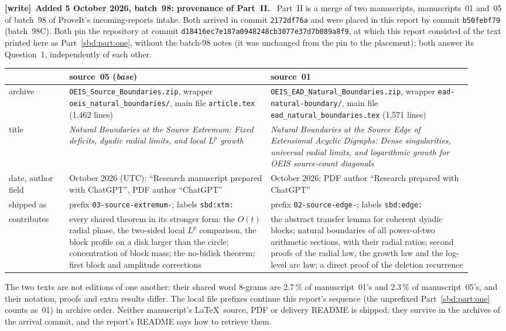 \documentclass[11pt,a4paper]{article}
\theoremstyle{definition}
\newenvironment{writenote}[1][]{\par\smallskip\begingroup\small
 \noindent\textbf{[write]}\if\relax\detokenize{#1}\relax\else~\textbf{#1.}\fi\ }%
 {\par\endgroup\smallskip}
\begin{document}
\begin{writenote}[Added 5 October 2026, batch~98: provenance of Part~II]
Part~II is a merge of two manuscripts, manuscripts~01 and~05 of batch~98 of
ProveIt's incoming-reports intake. Both arrived in commit
\nolinkurl{2172df76a} and were placed in this report by commit
\nolinkurl{b50febf79} (batch~98C). Both pin the repository at commit
\nolinkurl{d18416ec7e187a0948248cb3077e37d7b089a8f9}, at which this report
consisted of the text printed here as Part~\ref{sbd:part:one}, without the
batch-98 notes (it was unchanged from the pin to the placement); both answer
its Question~1, independently of each other.
\begin{center}\footnotesize
\begin{tabular}{@{}>{\raggedright\arraybackslash}p{0.12\linewidth}>{\raggedright\arraybackslash}p{0.40\linewidth}>{\raggedright\arraybackslash}p{0.40\linewidth}@{}}
\toprule
 & source~05 (\emph{base}) & source~01\\
\midrule
archive & \nolinkurl{OEIS_Source_Boundaries.zip}, wrapper \nolinkurl{oeis_natural_boundaries/}, main file \nolinkurl{article.tex} (1{,}462 lines) & \nolinkurl{OEIS_EAD_Natural_Boundaries.zip}, wrapper \nolinkurl{ead-natural-boundary/}, main file \nolinkurl{ead_natural_boundaries.tex} (1{,}571 lines)\\
title & \emph{Natural Boundaries at the Source Extremum: Fixed deficits, dyadic radial limits, and local $L^p$ growth} & \emph{Natural Boundaries at the Source Edge of Extensional Acyclic Digraphs: Dense singularities, universal radial limits, and logarithmic growth for OEIS source-count diagonals}\\
date, author field & 5 October 2026 (UTC); ``Research manuscript prepared with ChatGPT'', PDF author ``ChatGPT'' & 5 October 2026; PDF author ``Research prepared with ChatGPT''\\
shipped as & prefix \nolinkurl{03-source-extremum-}; labels \nolinkurl{sbd:xtm:} & prefix \nolinkurl{02-source-edge-}; labels \nolinkurl{sbd:edge:}\\
contributes & every shared theorem in its stronger form: the $O(t)$ radial phase, the two-sided local $L^p$ comparison, the block profile on a disk larger than the circle; concentration of block mass; the no-bidisk theorem; first block and amplitude corrections & the abstract transfer lemma for coherent dyadic blocks; natural boundaries of all power-of-two arithmetic sections, with their radial ratios; second proofs of the radial law, the growth law and the log-level arc law; a direct proof of the deletion recurrence\\
\bottomrule
\end{tabular}
\end{center}
The two texts are not editions of one another: their shared word 8-grams
are 2.7\,\% of manuscript~01's and 2.3\,\% of manuscript~05's, and their
notation, proofs and extra results differ.
The local file prefixes continue this report's sequence (the unprefixed
Part~\ref{sbd:part:one} counts as~01) in archive order. Neither manuscript's
\LaTeX\ source, PDF or delivery README is shipped; they survive in the
archives of the arrival commit, and the report's README says how to
retrieve them.


\end{writenote}
\end{document}
